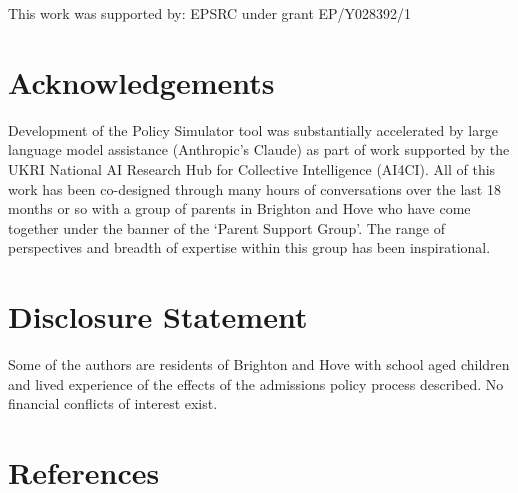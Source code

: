 \documentclass[
  12pt,
  titlepage]{article}
\begin{document}
This work was supported by: EPSRC under grant EP/Y028392/1

\section*{Acknowledgements}\label{acknowledgements}

Development of the Policy Simulator tool was substantially accelerated
by large language model assistance (Anthropic's Claude) as part of work
supported by the UKRI National AI Research Hub for Collective
Intelligence (AI4CI). All of this work has been co-designed through many
hours of conversations over the last 18 months or so with a group of
parents in Brighton and Hove who have come together under the banner of
the `Parent Support Group'. The range of perspectives and breadth of
expertise within this group has been inspirational.

\section*{Disclosure Statement}\label{disclosure-statement}

Some of the authors are residents of Brighton and Hove with school aged
children and lived experience of the effects of the admissions policy
process described. No financial conflicts of interest exist.

\section*{References}\label{references}
\end{document}
